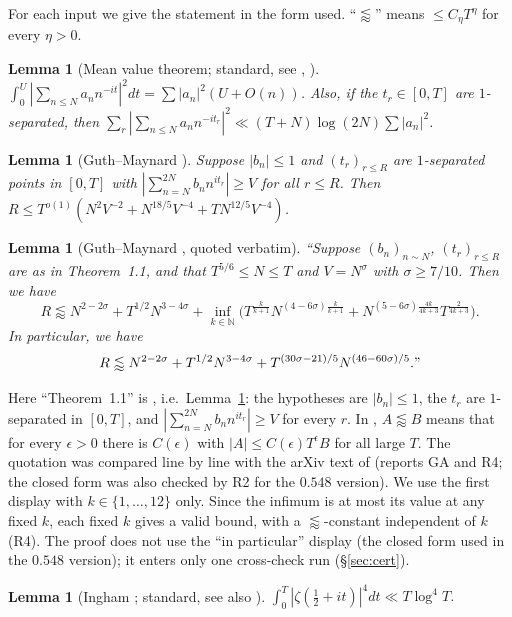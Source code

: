 \documentclass[11pt]{amsart}
\newtheorem{lemma}[theorem]{Lemma}
\theoremstyle{definition}
\theoremstyle{remark}
\begin{document}
For each input we give the statement in the form used. ``$\lessapprox$'' means $\le C_\eta T^{\eta}$ for every $\eta>0$.

\begin{lemma}[Mean value theorem; standard, see {\cite{MV}}, {\cite{Ga}}]\label{lem:MV}
$\int_0^U|\sum_{n\le N}a_nn^{-it}|^2dt=\sum|a_n|^2(U+O(n))$. Also, if the $t_r\in[0,T]$ are $1$-separated, then
$\sum_r|\sum_{n\le N}a_nn^{-it_r}|^2\ll(T+N)\log(2N)\sum|a_n|^2$.
\end{lemma}

\begin{lemma}[{Guth--Maynard \cite[Theorem~1.1]{GM}}]\label{lem:GM1}
Suppose $|b_n|\le1$ and $(t_r)_{r\le R}$ are $1$-separated points in $[0,T]$ with $|\sum_{n=N}^{2N}b_nn^{it_r}|\ge V$ for all $r\le R$. Then
$R\le T^{o(1)}(N^2V^{-2}+N^{18/5}V^{-4}+TN^{12/5}V^{-4})$.
\end{lemma}

\begin{lemma}[{Guth--Maynard \cite[Proposition~12.1]{GM}}, quoted verbatim]\label{lem:GM12}
``Suppose $(b_n)_{n\sim N}$, $(t_r)_{r\le R}$ are as in Theorem~1.1, and that $T^{5/6}\le N\le T$ and $V=N^{\sigma}$ with $\sigma\ge7/10$. Then
we have
\[
R\lessapprox N^{2-2\sigma}+T^{1/2}N^{3-4\sigma}+\inf_{k\in\mathbb N}\Big(T^{\frac{k}{k+1}}N^{(4-6\sigma)\frac{k}{k+1}}+N^{(5-6\sigma)\frac{4k}{4k+3}}T^{\frac{2}{4k+3}}\Big).
\]
In particular, we have
\[
R\lessapprox N^{2-2\sigma}+T^{1/2}N^{3-4\sigma}+T^{(30\sigma-21)/5}N^{(46-60\sigma)/5}."
\]
\end{lemma}

Here ``Theorem~1.1'' is \cite[Theorem~1.1]{GM}, i.e.\ Lemma~\ref{lem:GM1}: the hypotheses are $|b_n|\le1$, the $t_r$ are $1$-separated in
$[0,T]$, and $|\sum_{n=N}^{2N}b_nn^{it_r}|\ge V$ for every $r$. In \cite[\S1.2]{GM}, $A\lessapprox B$ means that for every $\epsilon>0$ there is
$C(\epsilon)$ with $|A|\le C(\epsilon)T^{\epsilon}B$ for all large $T$. The quotation was compared line by line with the arXiv text of \cite{GM}
(reports GA and R4; the closed form was also checked by R2 for the $0.548$ version). We use the first display with $k\in\{1,\dots,12\}$ only. Since the
infimum is at most its value at any fixed $k$, each fixed $k$ gives a valid bound, with a $\lessapprox$-constant independent of $k$ (R4).
The proof does not use the ``in particular'' display (the closed form used in the $0.548$ version); it enters only one cross-check run (\S\ref{sec:cert}).

\begin{lemma}[Ingham {\cite{In}}; standard, see also {\cite{Ti}}]\label{lem:Ing}
$\int_0^T|\zeta(\frac12+it)|^4dt\ll T\log^4T$.
\end{lemma}
\end{document}
